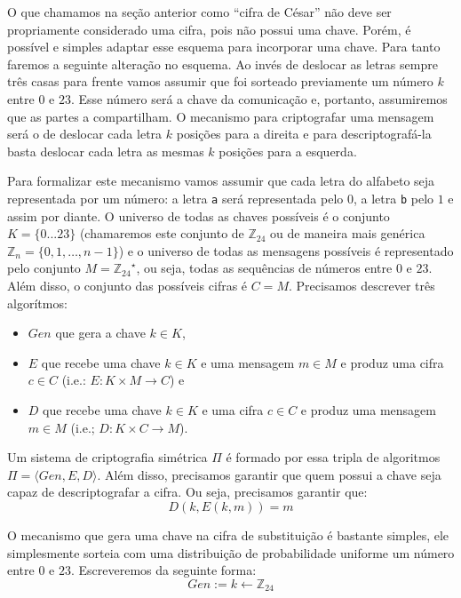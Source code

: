 O que chamamos na seção anterior como ``cifra de César'' não deve ser propriamente considerado uma cifra, pois não possui uma chave.
Porém, é possível e simples adaptar esse esquema para incorporar uma chave.
Para tanto faremos a seguinte alteração no esquema.
Ao invés de deslocar as letras sempre três casas para frente vamos assumir que foi sorteado previamente um número $k$ entre $0$ e $23$.
Esse número será a chave da comunicação e, portanto, assumiremos que as partes a compartilham.
O mecanismo para criptografar uma mensagem será o de deslocar cada letra $k$ posições para a direita e para descriptografá-la basta deslocar cada letra as mesmas $k$ posições para a esquerda.

Para formalizar este mecanismo vamos assumir que cada letra do alfabeto seja representada por um número: a letra {\tt a} será representada pelo $0$, a letra {\tt b} pelo $1$ e assim por diante.
O universo de todas as chaves possíveis é o conjunto $K = \{0 ... 23\}$ (chamaremos este conjunto de $\mathbb{Z}_{24}$ ou de maneira mais genérica $\mathbb{Z}_n = \{0, 1, \dots, n - 1\}$) e o universo de todas as mensagens possíveis é representado pelo conjunto $M = {\mathbb{Z}_{24}}^\star$, ou seja, todas as sequências de números entre $0$ e $23$.
Além disso, o conjunto das possíveis cifras é $C = M$.
Precisamos descrever três algorítmos:
\begin{itemize}
\item $Gen$ que gera a chave $k \in K$,
\item $E$ que recebe uma chave $k \in K$ e uma mensagem $m \in M$ e produz uma cifra $c \in C$ (i.e.: $E: K \times M \to C$) e
\item $D$ que recebe uma chave $k \in K$ e uma cifra $c \in C$ e produz uma mensagem $m \in M$ (i.e.; $D: K \times C \to M$).
\end{itemize}

Um sistema de criptografia simétrica $\Pi$ é formado por essa tripla de algoritmos $\Pi = \langle Gen, E, D \rangle$.
Além disso, precisamos garantir que quem possui a chave seja capaz de descriptografar a cifra.
Ou seja, precisamos garantir que:
\begin{displaymath}
  D(k, E(k, m)) = m
\end{displaymath}

O mecanismo que gera uma chave na cifra de substituição é bastante simples, ele simplesmente sorteia com uma distribuição de probabilidade uniforme um número entre $0$ e $23$.
Escreveremos da seguinte forma:
\begin{displaymath}
Gen := k \leftarrow \mathbb{Z}_{24}  
\end{displaymath}

